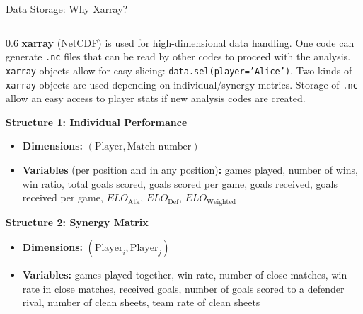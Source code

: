 \documentclass[10pt, aspectratio=169]{beamer}
\begin{document}
\begin{frame}{Data Storage: Why Xarray?}

\fontsize{7pt}{9pt}\selectfont

    \begin{columns}[T]
        \begin{column}{0.6\textwidth}
            \textbf{xarray} (NetCDF) is used for high-dimensional data handling. One code can generate \texttt{.nc} files that can be read by other codes to proceed with the analysis. \texttt{xarray} objects allow for easy slicing: \texttt{data.sel(player='Alice')}. Two kinds of \texttt{xarray} objects are used depending on individual/synergy metrics. Storage of \texttt{.nc} allow an easy access to player stats if new analysis codes are created.
            
            \vspace{1em}
            \textbf{Structure 1: Individual Performance}
            \begin{itemize}
                \item \textbf{Dimensions:} $(\text{Player}, \text{Match number})$
                \item \textbf{Variables} (per position and in any position)\textbf{:} games played, number of wins, win ratio, total goals scored, goals scored per game, goals received, goals received per game, $ELO_\text{Atk}$, $ELO_\text{Def}$, $ELO_\text{Weighted}$
            \end{itemize}

            \textbf{Structure 2: Synergy Matrix}
            \begin{itemize}
                \item \textbf{Dimensions:} $(\text{Player}_i, \text{Player}_j)$
                \item \textbf{Variables:} games played together, win rate, number of close matches, win rate in close matches, received goals, number of goals scored to a defender rival, number of clean sheets, team rate of clean sheets
            \end{itemize}
		\end{column}
     

\end{columns}
\end{frame}
\end{document}
